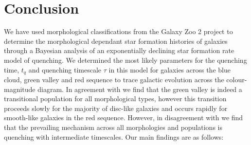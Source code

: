 \documentclass[useAMS,usenatbib]{mn2e}
\def\changed    {\color{titlecol} }
\begin{document}
\section{Conclusion}\label{conc}
We have used morphological classifications from the Galaxy Zoo 2 project to determine the morphological dependant star formation histories of galaxies through a Bayesian analysis of an exponentially declining star formation rate model of quenching. We determined the most likely parameters for the quenching time, $t_q$ and quenching timescale $\tau$ in this model for galaxies across the blue cloud, green valley and red sequence to trace galactic evolution across the colour-magnitude diagram. In agreement with \citet{Sch2014} we find that the green valley is indeed a transitional population for all morphological types, however this transition proceeds slowly for the majority of disc-like galaxies and occurs rapidly for smooth-like galaxies in the red sequence. However, in disagreement with \citet{Sch2014} {\changed we find that the prevailing mechanism across all morphologies and populations is quenching with intermediate timescales}. Our main findings are as follows:
\end{document}
